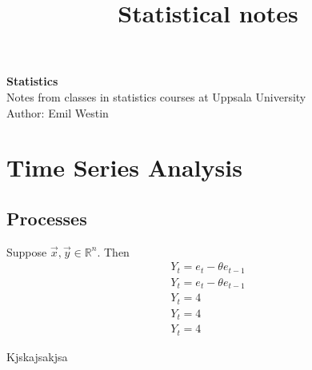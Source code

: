 \documentclass[11pt]{article}
\begin{document}
\title{Statistical notes}

\thispagestyle{empty}

\begin{center}
{\LARGE \bf Statistics}\\
Notes from classes in statistics courses at Uppsala University \\
Author: Emil Westin
\end{center}

\section{Time Series Analysis}
\subsection{Processes}

Suppose $\vec{x},\vec{y} \in \mathbb{R}^n$. Then 
\begin{align}
Y_t = e_t - \theta e_{t-1} \label{MA1} \\
Y_t = e_t - \theta e_{t-1}  \label{MA2} \\
Y_t = 4 \label{AR1} \\
Y_t = 4 \label{AR2} \\
Y_t = 4 \label{ARMA} 
\end{align}

Kjskajsakjsa
\end{document}
